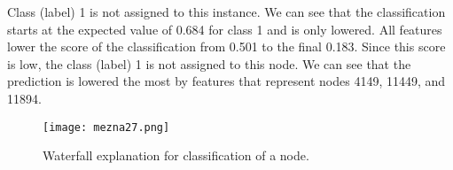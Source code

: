 \documentclass[twoside,11pt]{article}
\begin{document}
Class (label) 1 is not assigned to this instance. We can see that the classification starts at the expected value of 0.684 for class 1 and is only lowered. All features lower the score of the classification from 0.501 to the final 0.183. Since this score is low, the class (label) 1 is not assigned to this node. We can see that the prediction is lowered the most by features that represent nodes 4149, 11449, and 11894.

\begin{figure*}[h!]
  \centering
  \texttt{[image: mezna27.png]}
  \caption{Waterfall explanation for classification of a node.}
  \label{fig:watefall}
\end{figure*}
\end{document}
